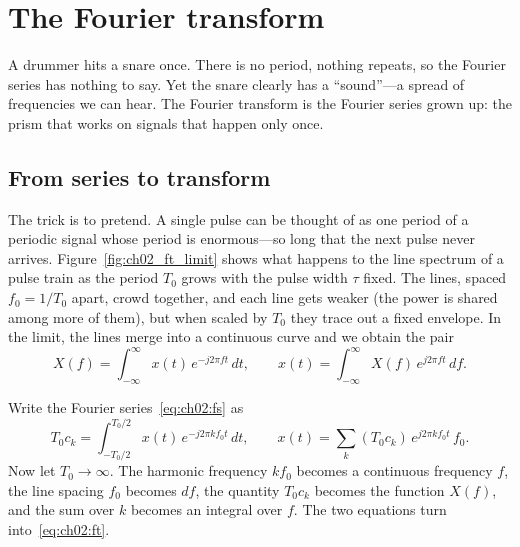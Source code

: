 \section{The Fourier transform}
\label{sec:ch02:ft}

A drummer hits a snare once. There is no period, nothing repeats, so the Fourier series has nothing
to say. Yet the snare clearly has a ``sound''---a spread of frequencies we can hear. The Fourier
transform is the Fourier series grown up: the prism that works on signals that happen only once.


\subsection{From series to transform}

The trick is to pretend. A single pulse can be thought of as one period of a periodic signal whose
period is enormous---so long that the next pulse never arrives. Figure~\ref{fig:ch02_ft_limit}
shows what happens to the line spectrum of a pulse train as the period $T_0$ grows with the pulse
width $\tau$ fixed. The lines, spaced $f_0=1/T_0$ apart, crowd together, and each line gets weaker
(the power is shared among more of them), but when scaled by $T_0$ they trace out a fixed envelope.
In the limit, the lines merge into a continuous curve and we obtain the 
pair
\begin{equation}
X(f)=\int_{-\infty}^{\infty}x(t)\,e^{-j2\pi f t}\,dt,
\qquad x(t)=\int_{-\infty}^{\infty}X(f)\,e^{j2\pi f t}\,df.
\label{eq:ch02:ft}
\end{equation}

\begin{deeper}
Write the Fourier series~\eqref{eq:ch02:fs} as
\begin{equation*}
T_0c_k=\int_{-T_0/2}^{T_0/2}x(t)\,e^{-j2\pi kf_0t}\,dt,\qquad
x(t)=\sum_k (T_0c_k)\,e^{j2\pi kf_0t}\,f_0 .
\end{equation*}
Now let $T_0\to\infty$. The harmonic frequency $kf_0$ becomes a continuous frequency $f$, the line
spacing $f_0$ becomes $df$, the quantity $T_0c_k$ becomes the function $X(f)$, and the sum over $k$
becomes an integral over $f$. The two equations turn into~\eqref{eq:ch02:ft}.
\end{deeper}

